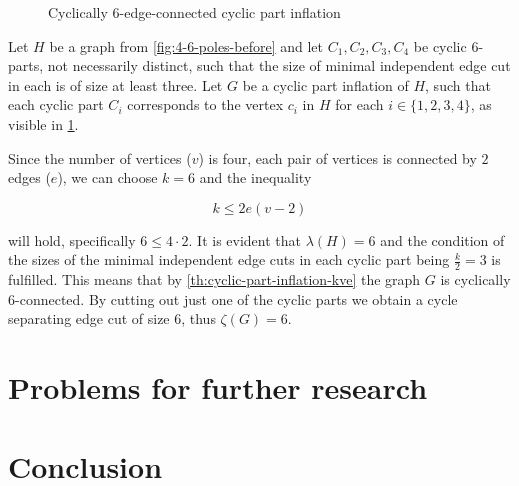 \documentclass[12pt, twoside]{book}
\begin{document}
\begin{example}
\begin{figure}
		\label{fig:4-6-poles-inflation}
		\caption{Cyclically 6-edge-connected cyclic part inflation}
	\end{figure}

	Let $H$ be a graph from \cref{fig:4-6-poles-before} and let $C_1,C_2,C_3,C_4$ be cyclic 6-parts, not necessarily distinct, such that the size of minimal independent edge cut in each is of size at least three. Let $G$ be a cyclic part inflation of $H$, such that each cyclic part $C_i$ corresponds to the vertex $c_i$ in $H$ for each $i\in\{1,2,3,4\}$, as visible in \cref{fig:4-6-poles-inflation}.
	
	Since the number of vertices ($v$) is four, each pair of vertices is connected by $2$ edges ($e$), we can choose $k=6$ and the inequality 
	
	$$k\leq 2e(v-2)$$
	
	will hold, specifically $6\leq 4\cdot 2$. It is evident that $\lambda(H)=6$ and the condition of the sizes of the minimal independent edge cuts in each cyclic part being $\frac{k}{2}=3$ is fulfilled. This means that by \cref{th:cyclic-part-inflation-kve} the graph $G$ is cyclically 6-connected. By cutting out just one of the cyclic parts we obtain a cycle separating edge cut of size 6, thus $\zeta(G)=6$.
\end{example}


\chapter{Problems for further research}

\todo{}

\chapter*{Conclusion}

\newpage
\thispagestyle{empty}




\end{document}
